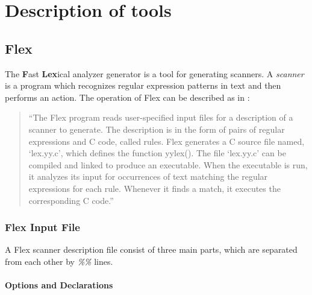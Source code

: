 \chapter{Description of tools}
\label{chap:TOOLS}


\section{Flex}

The {\Large\textbf{F}}ast {\Large\textbf{Lex}}ical analyzer generator is a tool
for generating scanners. A \emph{scanner} is a program which recognizes
regular expression patterns in text and then performs an action.
The operation of Flex can be described as in \citep*{FLEX}:
 \begin{quote}
``The Flex program reads user-specified input files for a description 
of a scanner to generate. The description is in the form of 
pairs of regular expressions and C code, called rules. Flex generates a C 
source file named, `lex.yy.c', which defines the function yylex(). The file 
`lex.yy.c' can be compiled and linked to produce an executable. When the 
executable is run, it analyzes its input for occurrences of text matching the 
regular expressions for each rule. Whenever it finds a match, it executes the 
corresponding C code.''
\end{quote}

\subsection{Flex Input File}

A Flex scanner description file consist of three main parts, which are 
separated from each other by \emph{\%\%} lines.

\subsubsection{Options and Declarations}

